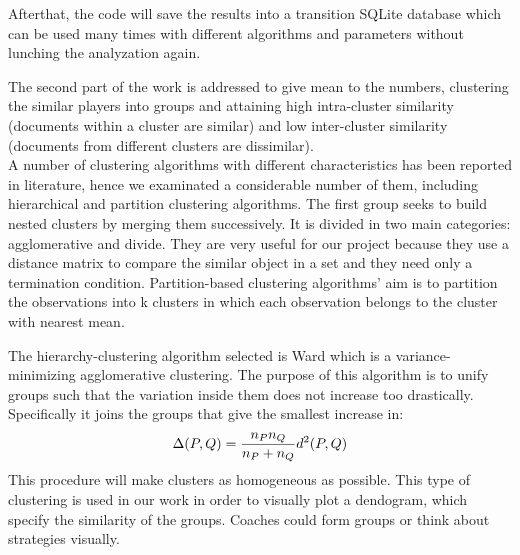 \documentclass{acm_proc_article-sp-sigmod07}
\begin{document}
Afterthat, the code will save the results into a transition SQLite database which can be used many times with different algorithms and parameters without lunching the analyzation again.

The second part of the work is addressed to give mean to the numbers, clustering the similar players into groups and attaining high intra-cluster similarity (documents within a cluster are similar) and low inter-cluster similarity (documents from different clusters are dissimilar).\\
A number of clustering algorithms with different characteristics has been reported in literature, hence we examinated a considerable number of them, including hierarchical and partition clustering algorithms. The first group seeks to build nested clusters by merging them successively. It is divided in two main categories: agglomerative and divide. They are very useful for our project because they use a distance matrix to compare the similar object in a set and they need only a termination condition. Partition-based clustering algorithms' aim is to partition the observations into k clusters in which each observation belongs to the cluster with nearest mean.

The hierarchy-clustering algorithm selected is Ward which is a variance-minimizing agglomerative clustering. The purpose of this algorithm is to unify groups such that the variation inside them does not increase too drastically. Specifically it joins the groups that give the smallest increase in:
$$\Delta(P,Q) = {n_Pn_Q \over n_P+n_Q} d^2(P,Q)$$
This procedure will make clusters as homogeneous as possible. This type of clustering is used in our work in order to visually plot a dendogram, which specify the similarity of the groups. Coaches could form groups or think about strategies visually.
\end{document}
